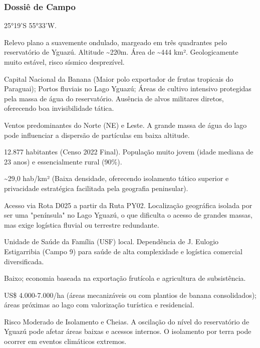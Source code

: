 \subsubsection{Dossiê de Campo}
\begin{description}[style=nextline,leftmargin=0.5cm,font=\bfseries]
\item[Coordenadas]  25°19'S 55°33'W.
\item[Topografia]  Relevo plano a suavemente ondulado, margeado em três quadrantes pelo reservatório de Yguazú. Altitude \textasciitilde 220m. Área de \textasciitilde 444 km². Geologicamente muito estável, risco sísmico desprezível.
\item[Alvos Estratégicos]  Capital Nacional da Banana (Maior polo exportador de frutas tropicais do Paraguai); Portos fluviais no Lago Yguazú; Áreas de cultivo intensivo protegidas pela massa de água do reservatório. Ausência de alvos militares diretos, oferecendo boa invisibilidade tática.
\item[Fallout]  Ventos predominantes do Norte (NE) e Leste. A grande massa de água do lago pode influenciar a dispersão de partículas em baixa altitude.
\item[População]  12.877 habitantes (Censo 2022 Final). População muito jovem (idade mediana de 23 anos) e essencialmente rural (90\%).
\item[Densidade]  \textasciitilde 29,0 hab/\allowbreak km² (Baixa densidade, oferecendo isolamento tático superior e privacidade estratégica facilitada pela geografia peninsular).
\item[Vias de Acesso]  Acesso via Rota D025 a partir da Ruta PY02. Localização geográfica isolada por ser uma "península" no Lago Yguazú, o que dificulta o acesso de grandes massas, mas exige logística fluvial ou terrestre redundante.
\item[Serviços]  Unidade de Saúde da Família (USF) local. Dependência de J. Eulogio Estigarribia (Campo 9) para saúde de alta complexidade e logística comercial diversificada.
\item[Custo de Vida]  Baixo; economia baseada na exportação frutícola e agricultura de subsistência.
\item[Preço da Terra]  US\$ 4.000-7.000/\allowbreak ha (áreas mecanizáveis ou com plantios de banana consolidados); áreas próximas ao lago com valorização turística e residencial.
\item[Hidrologia]  Risco Moderado de Isolamento e Cheias. A oscilação do nível do reservatório de Yguazú pode afetar áreas baixas e acessos internos. O isolamento por terra pode ocorrer em eventos climáticos extremos.

\end{description}
